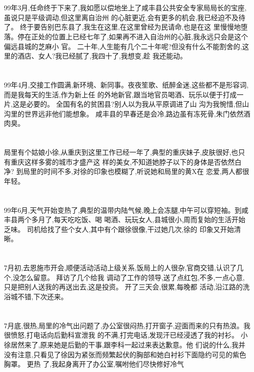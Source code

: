 \documentclass[11pt]{article}
\begin{document}
\section{}
99年3月,任命终于下来了,我如愿以偿地坐上了咸丰县公共安全专家局局长的宝座,虽说只是平级调动,但这里离自治州
的心脏更近,会有更多的机会,我已经迫不及待了。 终于要告别巴东县了,我生在这里,在这里曾经为民请命,也是在这
里慢慢地堕落。停在正处的位置上已经七年了,如果再不进入自治州的心脏,我永远只会是这个偏远县城的芝麻小
官。 二十年,人生能有几个二十年呢?但没有什么不能割舍的,这里的酒店、女人?我已经腻了,我四十了,我想变,趁
我还能动。

\section{}
99年4月,交接工作圆满,新环境、新同事。夜夜笙歌、纸醉金迷,这些都不是形容词,而是我每天的生活,作为新上任
的外地新官,跟当地官员喝酒、玩乐以便于打成一片,这是必要的。 全国有名的贫困县?别人以为我从平原调进了山
沟为我惋惜,但山沟里的世界远非他们能想象。 咸丰县的早春还是会冷,路边虽有冻死骨,朱门依然酒肉臭。

\section{}
局里有个姑娘小徐,从重庆到这里工作已经一年了,典型的重庆妹子,皮肤很好,也只有重庆这样多雾的城市才盛产这
样的美女,不知道她脖子以下的身体是否依然白净? 到局里的时间不多,对徐的印象也模糊了,听说她和局里的黄X在
恋爱,两人都很年轻。

\section{}
99年6月,天气开始变热了,典型的温带内陆气候,晚上会冻腿,中午可以穿短袖。到咸丰县两个多月了,每天吃吃饭、喝
喝酒、玩玩女人,县城很小,周而复始的生活开始乏味。 司机给找了些个女人,其中有个跟徐很像,干过她几次,徐的
印象又开始清晰。 　

\section{}
7月初,去恩施市开会,顺便活动活动上级关系,饭局上的人很杂,官商交错,认识了几个,没怎么留意。 拜访了几个给我
调动了工作的领导,送了点红包,不多,一点心意,只是把别人送我的再送出去,这是投资。 开了三天会,很累,每晚都
活动,沿江路的洗浴城不错,下次还来。

\section{}
7月底,很热,局里的冷气出问题了,办公室很闷热,打开窗子,迎面而来的只有热浪。我很愤怒,打电话向后勤科宣泄我
的不满,打完电话,发现汗已经浸透了我的衬衫。 小徐居然来了,原来她是后勤的干事,跟李科一起过来表达歉意。他
们说的什么,我并没有注意,只看见了徐因为紧张而频繁起伏的胸部和她白衬衫下面隐约可见的紫色胸罩。 更热
了,我起身离开了办公室,嘱咐他们尽快修好冷气
\end{document}
